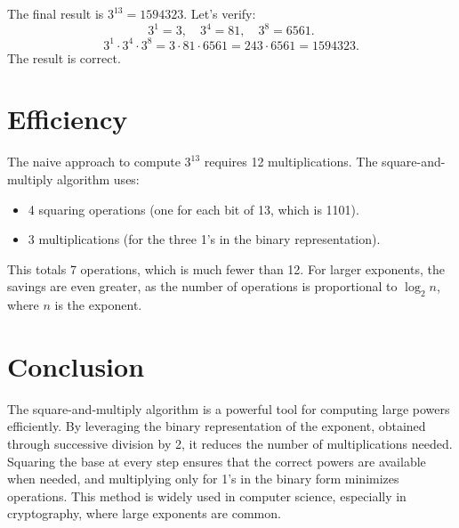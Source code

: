 \documentclass{article}
\begin{document}
    The final result is \(3^{13} = 1594323\). Let’s verify:
    \[
        3^1 = 3, \quad 3^4 = 81, \quad 3^8 = 6561.
    \]
    \[
        3^1 \cdot 3^4 \cdot 3^8 = 3 \cdot 81 \cdot 6561 = 243 \cdot 6561 = 1594323.
    \]
    The result is correct.

    \section{Efficiency}
    The naive approach to compute \(3^{13}\) requires 12 multiplications. The square-and-multiply algorithm uses:
    \begin{itemize}
        \item 4 squaring operations (one for each bit of 13, which is 1101).
        \item 3 multiplications (for the three 1’s in the binary representation).
    \end{itemize}
    This totals 7 operations, which is much fewer than 12. For larger exponents, the savings are even greater, as the number of operations is proportional to \(\log_2 n\), where \(n\) is the exponent.

    \section{Conclusion}
    The square-and-multiply algorithm is a powerful tool for computing large powers efficiently. By leveraging the binary representation of the exponent, obtained through successive division by 2, it reduces the number of multiplications needed. Squaring the base at every step ensures that the correct powers are available when needed, and multiplying only for 1’s in the binary form minimizes operations. This method is widely used in computer science, especially in cryptography, where large exponents are common.
\end{document}

